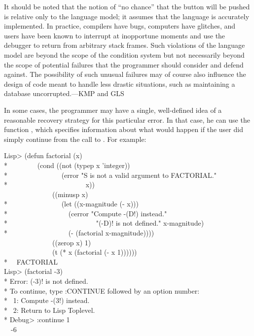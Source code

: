 \beforenoterule
\begin{sideremark}
It should be noted that the notion of
``no chance'' that the button will be pushed is relative only to the language
model; it assumes that the language is accurately implemented.  In practice,
compilers have bugs, computers have glitches, and users have been known
to interrupt at inopportune moments and use the debugger to return from
arbitrary stack frames.  Such violations of the language model are
beyond the scope of the condition system but not necessarily beyond the
scope of potential failures that the programmer should consider and defend against.
The possibility of such unusual failures may of course also influence the design of
code meant to handle less drastic situations,
such as maintaining a database uncorrupted.---KMP and GLS
\end{sideremark}
\afternoterule

In some cases, the programmer may have a single, well-defined idea of a
reasonable recovery strategy for this particular error. In that case, he can
use the function , which specifies information about what would happen
if the user did simply continue from the call to . For example:
\begin{lisp}
Lisp> (defun factorial (x) \\*
~~~~~~~~(cond ((not (typep x 'integer)) \\*
~~~~~~~~~~~~~~~(error "{\Xtilde}S is not a valid argument to FACTORIAL." \\*
~~~~~~~~~~~~~~~~~~~~~~x)) \\
~~~~~~~~~~~~~~((minusp x) \\*
~~~~~~~~~~~~~~~(let ((x-magnitude (- x))) \\*
~~~~~~~~~~~~~~~~~(cerror "Compute -({\Xtilde}D!) instead." \\*
~~~~~~~~~~~~~~~~~~~~~~~~~"(-{\Xtilde}D)! is not defined." x-magnitude) \\*
~~~~~~~~~~~~~~~~~(- (factorial x-magnitude)))) \\
~~~~~~~~~~~~~~((zerop x) 1) \\
~~~~~~~~~~~~~~(t (* x (factorial (- x 1)))))) \\*
~\EV\ FACTORIAL \\
Lisp> (factorial -3) \\*
Error: (-3)! is not defined. \\*
To continue, type :CONTINUE followed by an option number: \\*
~1: Compute -(3!) instead. \\*
~2: Return to Lisp Toplevel. \\*
Debug> :continue 1 \\
~\EV\ -6
\end{lisp}


